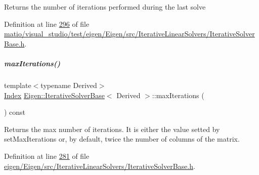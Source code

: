 \begin{DoxyReturn}{Returns}
the number of iterations performed during the last solve 
\end{DoxyReturn}


Definition at line \hyperlink{matio_2visual__studio_2test_2eigen_2_eigen_2src_2_iterative_linear_solvers_2_iterative_solver_base_8h_source_l00296}{296} of file \hyperlink{matio_2visual__studio_2test_2eigen_2_eigen_2src_2_iterative_linear_solvers_2_iterative_solver_base_8h_source}{matio/visual\+\_\+studio/test/eigen/\+Eigen/src/\+Iterative\+Linear\+Solvers/\+Iterative\+Solver\+Base.\+h}.

\mbox{\label{group___iterative_linear_solvers___module_a168a74c8dceb6233b220031fdd756ba0}} 
\subparagraph{\texorpdfstring{max\+Iterations()}{maxIterations()}\hspace{0.1cm}{\footnotesize\ttfamily [1/2]}}
{\footnotesize\ttfamily template$<$typename Derived$>$ \\
\hyperlink{namespace_eigen_a62e77e0933482dafde8fe197d9a2cfde}{Index} \hyperlink{group___iterative_linear_solvers___module_class_eigen_1_1_iterative_solver_base}{Eigen\+::\+Iterative\+Solver\+Base}$<$ Derived $>$\+::max\+Iterations (\begin{DoxyParamCaption}{ }\end{DoxyParamCaption}) const\hspace{0.3cm}{\ttfamily [inline]}}

\begin{DoxyReturn}{Returns}
the max number of iterations. It is either the value setted by set\+Max\+Iterations or, by default, twice the number of columns of the matrix. 
\end{DoxyReturn}


Definition at line \hyperlink{eigen_2_eigen_2src_2_iterative_linear_solvers_2_iterative_solver_base_8h_source_l00281}{281} of file \hyperlink{eigen_2_eigen_2src_2_iterative_linear_solvers_2_iterative_solver_base_8h_source}{eigen/\+Eigen/src/\+Iterative\+Linear\+Solvers/\+Iterative\+Solver\+Base.\+h}.

